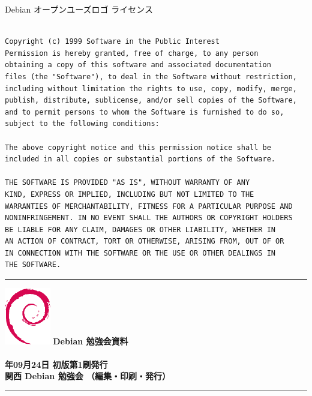 \documentclass[mingoth,a4paper]{jsarticle}
\newcommand{\debmtgyear}{2017}
\newcommand{\debmtgdate}{24}
\newcommand{\debmtgmonth}{09}
\begin{document}
\begin{center}
Debian オープンユーズロゴ ライセンス
\end{center}

\begin{multicols}{2}
 \begin{fontsize}{6}{6}
 \begin{verbatim}

Copyright (c) 1999 Software in the Public Interest
Permission is hereby granted, free of charge, to any person
obtaining a copy of this software and associated documentation
files (the "Software"), to deal in the Software without restriction,
including without limitation the rights to use, copy, modify, merge,
publish, distribute, sublicense, and/or sell copies of the Software,
and to permit persons to whom the Software is furnished to do so,
subject to the following conditions:

The above copyright notice and this permission notice shall be
included in all copies or substantial portions of the Software.

THE SOFTWARE IS PROVIDED "AS IS", WITHOUT WARRANTY OF ANY
KIND, EXPRESS OR IMPLIED, INCLUDING BUT NOT LIMITED TO THE
WARRANTIES OF MERCHANTABILITY, FITNESS FOR A PARTICULAR PURPOSE AND
NONINFRINGEMENT. IN NO EVENT SHALL THE AUTHORS OR COPYRIGHT HOLDERS
BE LIABLE FOR ANY CLAIM, DAMAGES OR OTHER LIABILITY, WHETHER IN
AN ACTION OF CONTRACT, TORT OR OTHERWISE, ARISING FROM, OUT OF OR
IN CONNECTION WITH THE SOFTWARE OR THE USE OR OTHER DEALINGS IN
THE SOFTWARE.
 \end{verbatim}
 \end{fontsize}
\end{multicols}

\printindex

 \begin{minipage}[b]{0.2\hsize}
 \end{minipage}
 \begin{minipage}[b]{0.8\hsize}

 \vspace*{15cm}
 \rule{\hsize}{1mm}
 \vspace{2mm}
 \includegraphics[width=2cm]{image200502/openlogo-nd.eps}
 \noindent \Large \bfseries{Debian 勉強会資料}\\ \\
 \noindent \normalfont \debmtgyear{}年\debmtgmonth{}月\debmtgdate{}日 \hspace{5mm}  初版第1刷発行\\
 \noindent \normalfont 関西 Debian 勉強会 （編集・印刷・発行）\\
 \rule{\hsize}{1mm}
 \end{minipage}
\end{document}
